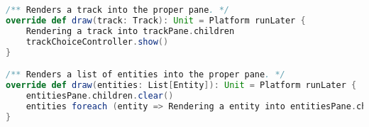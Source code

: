 \begin{lstlisting}[label=code:view-draw, language=Scala, caption=Applicazione della \textit{dsl} \texttt{Rendering}]
/** Renders a track into the proper pane. */
override def draw(track: Track): Unit = Platform runLater {
    Rendering a track into trackPane.children
    trackChoiceController.show()
}

/** Renders a list of entities into the proper pane. */
override def draw(entities: List[Entity]): Unit = Platform runLater {
    entitiesPane.children.clear()
    entities foreach (entity => Rendering a entity into entitiesPane.children)
}
\end{lstlisting}